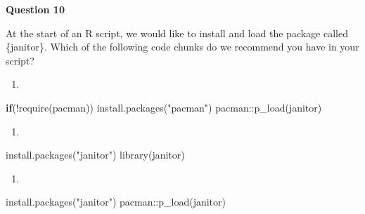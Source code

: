 \documentclass[
  letterpaper,
  DIV=11,
  numbers=noendperiod]{scrreprt}
\newenvironment{Shaded}{\begin{snugshade}}{\end{snugshade}}
\newcommand{\ControlFlowTok}[1]{\textcolor[rgb]{0.00,0.23,0.31}{\textbf{#1}}}
\newcommand{\FunctionTok}[1]{\textcolor[rgb]{0.28,0.35,0.67}{#1}}
\newcommand{\NormalTok}[1]{\textcolor[rgb]{0.00,0.23,0.31}{#1}}
\newcommand{\SpecialCharTok}[1]{\textcolor[rgb]{0.37,0.37,0.37}{#1}}
\newcommand{\StringTok}[1]{\textcolor[rgb]{0.13,0.47,0.30}{#1}}
\providecommand{\tightlist}{%
  \setlength{\itemsep}{0pt}\setlength{\parskip}{0pt}}\usepackage{longtable,booktabs,array}
\begin{document}
\begin{tcolorbox}[enhanced jigsaw, title=\textcolor{quarto-callout-tip-color}{\faLightbulb}\hspace{0.5em}{Practice}, colbacktitle=quarto-callout-tip-color!10!white, leftrule=.75mm, arc=.35mm, opacityback=0, bottomrule=.15mm, rightrule=.15mm, toptitle=1mm, breakable, toprule=.15mm, colback=white, coltitle=black, colframe=quarto-callout-tip-color-frame, bottomtitle=1mm, titlerule=0mm, left=2mm, opacitybacktitle=0.6]

\textbf{Question 10}

At the start of an R script, we would like to install and load the
package called \{janitor\}. Which of the following code chunks do we
recommend you have in your script?

\begin{enumerate}
\def\labelenumi{\Alph{enumi}.}
\tightlist
\item
\end{enumerate}

\begin{Shaded}
\begin{Highlighting}[]
\ControlFlowTok{if}\NormalTok{(}\SpecialCharTok{!}\FunctionTok{require}\NormalTok{(pacman)) }\FunctionTok{install.packages}\NormalTok{(}\StringTok{"pacman"}\NormalTok{)}
\NormalTok{pacman}\SpecialCharTok{::}\FunctionTok{p\_load}\NormalTok{(janitor)}
\end{Highlighting}
\end{Shaded}

\begin{enumerate}
\def\labelenumi{\Alph{enumi}.}
\setcounter{enumi}{1}
\tightlist
\item
\end{enumerate}

\begin{Shaded}
\begin{Highlighting}[]
\FunctionTok{install.packages}\NormalTok{(}\StringTok{"janitor"}\NormalTok{)}
\FunctionTok{library}\NormalTok{(janitor)}
\end{Highlighting}
\end{Shaded}

\begin{enumerate}
\def\labelenumi{\Alph{enumi}.}
\setcounter{enumi}{2}
\tightlist
\item
\end{enumerate}

\begin{Shaded}
\begin{Highlighting}[]
\FunctionTok{install.packages}\NormalTok{(}\StringTok{"janitor"}\NormalTok{)}
\NormalTok{pacman}\SpecialCharTok{::}\FunctionTok{p\_load}\NormalTok{(janitor)}
\end{Highlighting}
\end{Shaded}

\end{tcolorbox}
\end{document}
